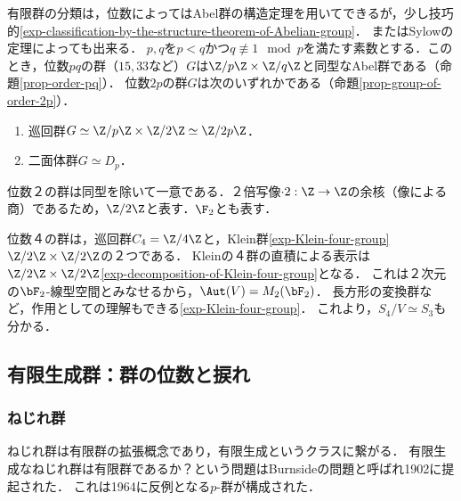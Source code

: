 \documentclass[uplatex,dvipdfmx]{jsreport}
\begin{document}
\begin{example}
    有限群の分類は，位数によってはAbel群の構造定理を用いてできるが，少し技巧的\ref{exp-classification-by-the-structure-theorem-of-Abelian-group}．
    またはSylowの定理によっても出来る．
    $p,q$を$p<q$かつ$q\not\equiv1\mod p$を満たす素数とする．このとき，位数$pq$の群（$15,33$など）$G$は$\Z/p\Z\times\Z/q\Z$と同型なAbel群である（命題\ref{prop-order-pq}）．
    位数$2p$の群$G$は次のいずれかである（命題\ref{prop-group-of-order-2p}）．
    \begin{enumerate}
        \item 巡回群$G\simeq\Z/p\Z\times\Z/2\Z\simeq\Z/2p\Z$．
        \item 二面体群$G\simeq D_p$．
    \end{enumerate}
\end{example}

\begin{example}
    位数２の群は同型を除いて一意である．２倍写像$\cdot 2:\Z\to\Z$の余核（像による商）であるため，$\Z/2\Z$と表す．$\F_2$とも表す．
\end{example}

\begin{example}
    位数４の群は，巡回群$C_4=\Z/4\Z$と，Klein群\ref{exp-Klein-four-group}$\Z/2\Z\times\Z/2\Z$の２つである．
    Kleinの４群の直積による表示は$\Z/2\Z\times\Z/2\Z$\ref{exp-decomposition-of-Klein-four-group}となる．
    これは２次元の$\bF_2$-線型空間とみなせるから，$\Aut(V)=M_2(\bF_2)$．
    長方形の変換群など，作用としての理解もできる\ref{exp-Klein-four-group}．
    これより，$S_4/V\simeq S_3$も分かる．
\end{example}

\subsection{有限生成群：群の位数と捩れ}

\subsubsection{ねじれ群}

\begin{tcolorbox}[colframe=ForestGreen, colback=ForestGreen!10!white,breakable,colbacktitle=ForestGreen!40!white,coltitle=black,fonttitle=\bfseries\sffamily,
    title=]
        ねじれ群は有限群の拡張概念であり，有限生成というクラスに繋がる．
        有限生成なねじれ群は有限群であるか？という問題はBurnsideの問題と呼ばれ1902に提起された．
        これは1964に反例となる$p$-群が構成された．
\end{tcolorbox}
\end{document}
